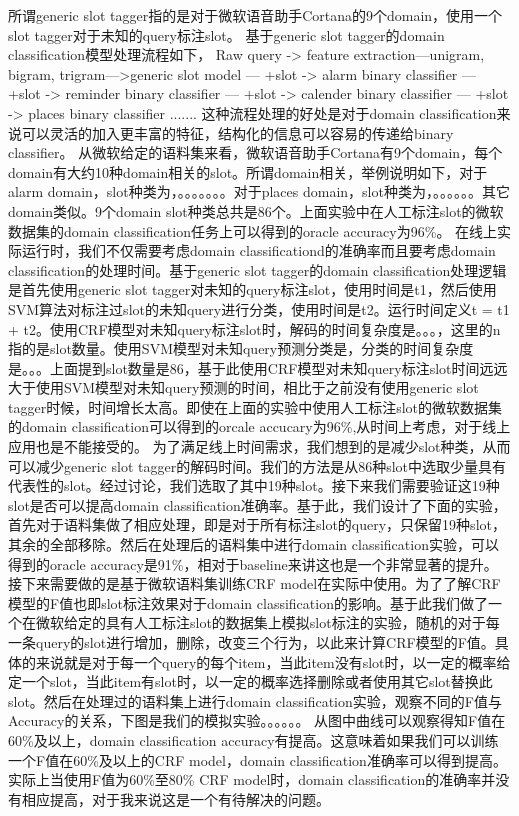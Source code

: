 \documentclass[master]{njuthesis}
\begin{document}
    所谓generic slot tagger指的是对于微软语音助手Cortana的9个domain，使用一个slot tagger对于未知的query标注slot。    
    基于generic slot tagger的domain classification模型处理流程如下，
    Raw query -> feature extraction---unigram, bigram, trigram--->generic slot model 
--- +slot -> alarm binary classifier
--- +slot -> reminder binary classifier
--- +slot -> calender binary classifier
--- +slot -> places binary classifier
.......
    这种流程处理的好处是对于domain classification来说可以灵活的加入更丰富的特征，结构化的信息可以容易的传递给binary classifier。
    从微软给定的语料集来看，微软语音助手Cortana有9个domain，每个domain有大约10种domain相关的slot。所谓domain相关，举例说明如下，对于alarm domain，slot种类为，。。。。。。。对于places domain，slot种类为，。。。。。。其它domain类似。9个domain slot种类总共是86个。上面实验中在人工标注slot的微软数据集的domain classification任务上可以得到的oracle accuracy为96\%。
    在线上实际运行时，我们不仅需要考虑domain classificationd的准确率而且要考虑domain classification的处理时间。基于generic slot tagger的domain classification处理逻辑是首先使用generic slot tagger对未知的query标注slot，使用时间是t1，然后使用SVM算法对标注过slot的未知query进行分类，使用时间是t2。运行时间定义t = t1 + t2。使用CRF模型对未知query标注slot时，解码的时间复杂度是。。。，这里的n指的是slot数量。使用SVM模型对未知query预测分类是，分类的时间复杂度是。。。上面提到slot数量是86，基于此使用CRF模型对未知query标注slot时间远远大于使用SVM模型对未知query预测的时间，相比于之前没有使用generic slot tagger时候，时间增长太高。即使在上面的实验中使用人工标注slot的微软数据集的domain classification可以得到的orcale accucary为96\%,从时间上考虑，对于线上应用也是不能接受的。
    为了满足线上时间需求，我们想到的是减少slot种类，从而可以减少generic slot tagger的解码时间。我们的方法是从86种slot中选取少量具有代表性的slot。经过讨论，我们选取了其中19种slot。接下来我们需要验证这19种slot是否可以提高domain classification准确率。基于此，我们设计了下面的实验，首先对于语料集做了相应处理，即是对于所有标注slot的query，只保留19种slot，其余的全部移除。然后在处理后的语料集中进行domain classification实验，可以得到的oracle accuracy是91\%，相对于baseline来讲这也是一个非常显著的提升。
    接下来需要做的是基于微软语料集训练CRF model在实际中使用。为了了解CRF模型的F值也即slot标注效果对于domain classification的影响。基于此我们做了一个在微软给定的具有人工标注slot的数据集上模拟slot标注的实验，随机的对于每一条query的slot进行增加，删除，改变三个行为，以此来计算CRF模型的F值。具体的来说就是对于每一个query的每个item，当此item没有slot时，以一定的概率给定一个slot，当此item有slot时，以一定的概率选择删除或者使用其它slot替换此slot。然后在处理过的语料集上进行domain classification实验，观察不同的F值与Accuracy的关系，下图是我们的模拟实验。。。。。。
    从图中曲线可以观察得知F值在60\%及以上，domain classification accuracy有提高。这意味着如果我们可以训练一个F值在60\%及以上的CRF model，domain classification准确率可以得到提高。实际上当使用F值为60\%至80\% CRF model时，domain classification的准确率并没有相应提高，对于我来说这是一个有待解决的问题。
\end{document}
